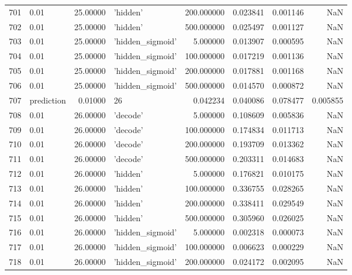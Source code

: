 \documentclass[10pt,a4paper]{article}
\begin{document}
\begin{tabular}{llrlrrrr}
701  &        0.01 &  25.00000 &           'hidden' &  200.000000 &  0.023841 &  0.001146 &       NaN \\
702  &        0.01 &  25.00000 &           'hidden' &  500.000000 &  0.025497 &  0.001127 &       NaN \\
703  &        0.01 &  25.00000 &   'hidden\_sigmoid' &    5.000000 &  0.013907 &  0.000595 &       NaN \\
704  &        0.01 &  25.00000 &   'hidden\_sigmoid' &  100.000000 &  0.017219 &  0.001136 &       NaN \\
705  &        0.01 &  25.00000 &   'hidden\_sigmoid' &  200.000000 &  0.017881 &  0.001168 &       NaN \\
706  &        0.01 &  25.00000 &   'hidden\_sigmoid' &  500.000000 &  0.014570 &  0.000872 &       NaN \\
707  &  prediction &   0.01000 &                 26 &    0.042234 &  0.040086 &  0.078477 &  0.005855 \\
708  &        0.01 &  26.00000 &           'decode' &    5.000000 &  0.108609 &  0.005836 &       NaN \\
709  &        0.01 &  26.00000 &           'decode' &  100.000000 &  0.174834 &  0.011713 &       NaN \\
710  &        0.01 &  26.00000 &           'decode' &  200.000000 &  0.193709 &  0.013362 &       NaN \\
711  &        0.01 &  26.00000 &           'decode' &  500.000000 &  0.203311 &  0.014683 &       NaN \\
712  &        0.01 &  26.00000 &           'hidden' &    5.000000 &  0.176821 &  0.010175 &       NaN \\
713  &        0.01 &  26.00000 &           'hidden' &  100.000000 &  0.336755 &  0.028265 &       NaN \\
714  &        0.01 &  26.00000 &           'hidden' &  200.000000 &  0.338411 &  0.029549 &       NaN \\
715  &        0.01 &  26.00000 &           'hidden' &  500.000000 &  0.305960 &  0.026025 &       NaN \\
716  &        0.01 &  26.00000 &   'hidden\_sigmoid' &    5.000000 &  0.002318 &  0.000073 &       NaN \\
717  &        0.01 &  26.00000 &   'hidden\_sigmoid' &  100.000000 &  0.006623 &  0.000229 &       NaN \\
718  &        0.01 &  26.00000 &   'hidden\_sigmoid' &  200.000000 &  0.024172 &  0.002095 &       NaN \\

\end{tabular}
\end{document}
